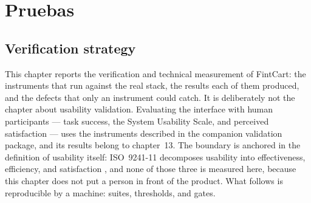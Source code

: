 
\section{Pruebas}


\subsection{Verification strategy}

This chapter reports the verification and technical measurement of FintCart: the instruments that
run against the real stack, the results each of them produced, and the defects that only an
instrument could catch. It is deliberately not the chapter about usability validation. Evaluating
the interface with human participants — task success, the System Usability Scale, and perceived
satisfaction — uses the instruments described in the companion validation package, and its results
belong to chapter~13. The boundary is anchored in the definition of usability itself: ISO~9241-11
decomposes usability into effectiveness, efficiency, and satisfaction
\parencite{iso2018usability},
and none of those three is measured here, because this chapter does not put a person in front of the
product. What follows is reproducible by a machine: suites, thresholds, and gates.

